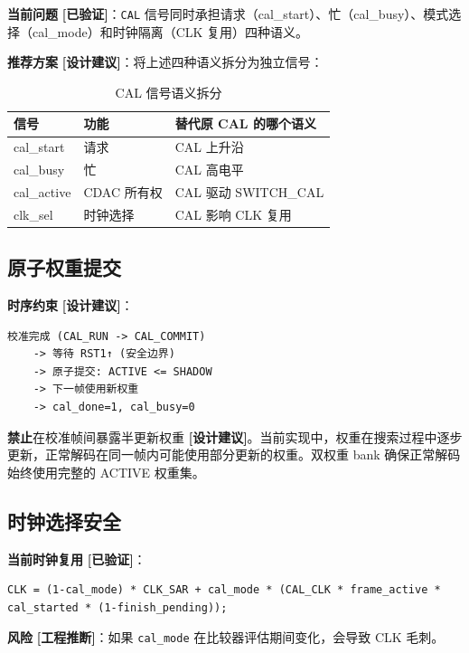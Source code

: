 \documentclass[UTF8,a4paper,11pt]{ctexart}
\newcommand{\verified}{\textcolor{verifiedgreen}{\textbf{[已验证]}}}
\newcommand{\inferred}{\textcolor{inferorange}{\textbf{[工程推断]}}}
\newcommand{\suggested}{\textcolor{suggestblue}{\textbf{[设计建议]}}}
\begin{document}
\textbf{当前问题} \verified：\texttt{CAL} 信号同时承担请求（cal\_start）、忙（cal\_busy）、模式选择（cal\_mode）和时钟隔离（CLK 复用）四种语义。

\textbf{推荐方案} \suggested：将上述四种语义拆分为独立信号：

\begin{table}[H]
\centering
\caption{CAL 信号语义拆分}
\label{tab:cal-split}
\begin{tabular}{lll}
\toprule
信号 & 功能 & 替代原 CAL 的哪个语义 \\
\midrule
cal\_start & 请求        & CAL 上升沿 \\
cal\_busy  & 忙          & CAL 高电平 \\
cal\_active & CDAC 所有权 & CAL 驱动 SWITCH\_CAL \\
clk\_sel   & 时钟选择    & CAL 影响 CLK 复用 \\
\bottomrule
\end{tabular}
\end{table}

\subsection{原子权重提交}

\textbf{时序约束} \suggested：

\begin{lstlisting}[style=textstyle]
校准完成 (CAL_RUN -> CAL_COMMIT)
    -> 等待 RST1↑ (安全边界)
    -> 原子提交: ACTIVE <= SHADOW
    -> 下一帧使用新权重
    -> cal_done=1, cal_busy=0
\end{lstlisting}

\textbf{禁止}在校准帧间暴露半更新权重 \suggested。当前实现中，权重在搜索过程中逐步更新，正常解码在同一帧内可能使用部分更新的权重。双权重 bank 确保正常解码始终使用完整的 ACTIVE 权重集。

\subsection{时钟选择安全}

\textbf{当前时钟复用} \verified：

\begin{lstlisting}[style=verilogstyle]
CLK = (1-cal_mode) * CLK_SAR + cal_mode * (CAL_CLK * frame_active * cal_started * (1-finish_pending));
\end{lstlisting}

\textbf{风险} \inferred：如果 \texttt{cal\_mode} 在比较器评估期间变化，会导致 CLK 毛刺。
\end{document}
